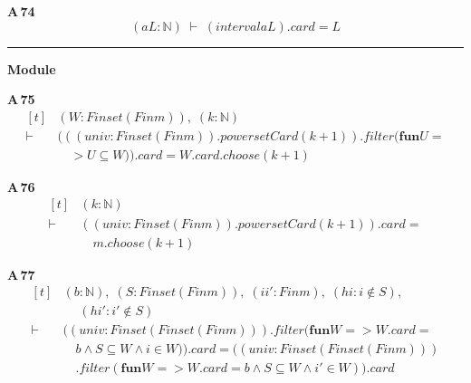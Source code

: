 \noindent\textbf{A\,74}\quad{}
{\footnotesize\[ (\mathit{a} \mathit{L} : \mathbb{N} ) \;\vdash\; (\mathit{interval} \mathit{a} \mathit{L}).\mathit{card}=\mathit{L} \]}

\vspace{4pt}\noindent\rule{\columnwidth}{0.4pt}\par\vspace{2pt}
\noindent\textbf{Module }\par\vspace{3pt}

\noindent\textbf{A\,75}\quad{}
{\footnotesize\[ \begin{aligned}[t]
&(\mathit{W} : \mathit{Finset} (\mathit{Fin} \mathit{m})),\; (\mathit{k} : \mathbb{N} )\\
\vdash\;&(((\mathit{univ} : \mathit{Finset} (\mathit{Fin} \mathit{m})).\mathit{powersetCard} (\mathit{k}+1)).\mathit{filter} (\mathbf{fun} \mathit{U} =\\
&\quad > \mathit{U} \subseteq \mathit{W})).\mathit{card} = \mathit{W}.\mathit{card}.\mathit{choose} (\mathit{k}+1)
\end{aligned} \]}

\noindent\textbf{A\,76}\quad{}
{\footnotesize\[ \begin{aligned}[t]
&(\mathit{k} : \mathbb{N} )\\
\vdash\;&((\mathit{univ} : \mathit{Finset} (\mathit{Fin} \mathit{m})).\mathit{powersetCard} (\mathit{k}+1)).\mathit{card} =\\
&\quad \mathit{m}.\mathit{choose} (\mathit{k}+1)
\end{aligned} \]}

\noindent\textbf{A\,77}\quad{}
{\footnotesize\[ \begin{aligned}[t]
&(\mathit{b} : \mathbb{N} ),\; (\mathit{S} : \mathit{Finset} (\mathit{Fin} \mathit{m})),\; (\mathit{i} \mathit{i'} : \mathit{Fin} \mathit{m}),\; (\mathit{hi} : \mathit{i} \notin \mathit{S}),\\
&\quad \; (\mathit{hi'} : \mathit{i'} \notin \mathit{S})\\
\vdash\;&((\mathit{univ} : \mathit{Finset} (\mathit{Finset} (\mathit{Fin} \mathit{m}))).\mathit{filter} (\mathbf{fun} \mathit{W} => \mathit{W}.\mathit{card} =\\
&\quad \mathit{b} \wedge \mathit{S} \subseteq \mathit{W} \wedge \mathit{i} \in \mathit{W})).\mathit{card} = ((\mathit{univ} : \mathit{Finset} (\mathit{Finset} (\mathit{Fin} \mathit{m})))\\
&\quad .\mathit{filter} (\mathbf{fun} \mathit{W} => \mathit{W}.\mathit{card} = \mathit{b} \wedge \mathit{S} \subseteq \mathit{W} \wedge \mathit{i'} \in \mathit{W})).\mathit{card}
\end{aligned} \]}

